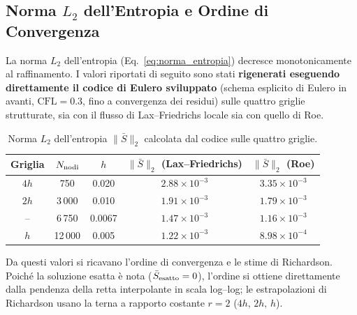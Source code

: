 \subsection{Norma $L_2$ dell'Entropia e Ordine di Convergenza}

La norma $L_2$ dell'entropia (Eq.~\eqref{eq:norma_entropia}) decresce monotonicamente al
raffinamento. I valori riportati di seguito sono stati \textbf{rigenerati eseguendo direttamente
il codice di Eulero sviluppato} (schema esplicito di Eulero in avanti, $\mathrm{CFL}=0.3$, fino a
convergenza dei residui) sulle quattro griglie strutturate, sia con il flusso di Lax--Friedrichs
locale sia con quello di Roe.

\begin{table}[H]
  \centering
  \caption{Norma $L_2$ dell'entropia $\|\bar S\|_2$ calcolata dal codice sulle quattro griglie.}
  \label{tab:bump_norme}
  \renewcommand{\arraystretch}{1.2}
  \begin{tabular}{ccccc}
    \toprule
    Griglia & $N_{\rm nodi}$ & $h$ & $\|\bar S\|_2$ (Lax--Friedrichs) & $\|\bar S\|_2$ (Roe) \\
    \midrule
    $4h$ & 750    & 0.020  & $2.88\times10^{-3}$ & $3.35\times10^{-3}$ \\
    $2h$ & 3\,000 & 0.010  & $1.91\times10^{-3}$ & $1.79\times10^{-3}$ \\
    --   & 6\,750 & 0.0067 & $1.47\times10^{-3}$ & $1.16\times10^{-3}$ \\
    $h$  & 12\,000& 0.005  & $1.22\times10^{-3}$ & $8.98\times10^{-4}$ \\
    \bottomrule
  \end{tabular}
\end{table}

Da questi valori si ricavano l'ordine di convergenza e le stime di Richardson. Poiché la
soluzione esatta è nota ($\bar S_{\rm esatto}=0$), l'ordine si ottiene direttamente dalla
pendenza della retta interpolante in scala log--log; le estrapolazioni di Richardson usano la
terna a rapporto costante $r=2$ ($4h,\,2h,\,h$).

